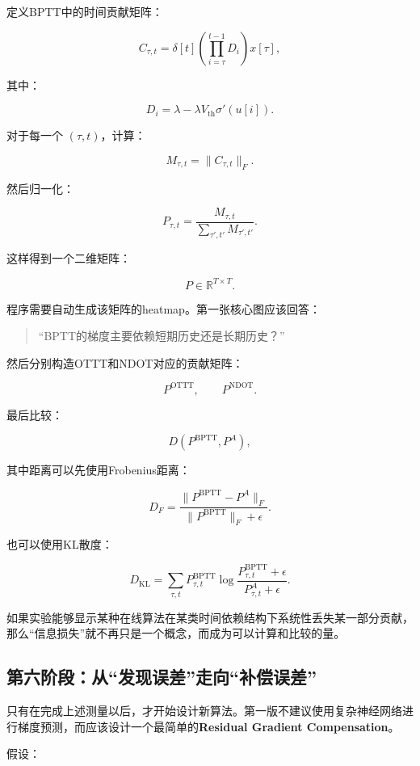 \documentclass[journal,12pt,onecolumn]{IEEEtran}
\begin{document}
定义BPTT中的时间贡献矩阵：

\[
C_{\tau,t}
=
\delta[t]
\left(
\prod_{i=\tau}^{t-1}D_i
\right)
x[\tau],
\]

其中：

\[
D_i
=
\lambda
-
\lambda V_{\mathrm{th}}
\sigma'(u[i]).
\]

对于每一个 \((\tau,t)\)，计算：

\[
M_{\tau,t}
=
\|C_{\tau,t}\|_F.
\]

然后归一化：

\[
P_{\tau,t}
=
\frac{M_{\tau,t}}
{\sum_{\tau',t'}M_{\tau',t'}}.
\]

这样得到一个二维矩阵：

\[
P\in\mathbb{R}^{T\times T}.
\]

程序需要自动生成该矩阵的heatmap。第一张核心图应该回答：

\begin{quote}
“BPTT的梯度主要依赖短期历史还是长期历史？”
\end{quote}

然后分别构造OTTT和NDOT对应的贡献矩阵：

\[
P^{\mathrm{OTTT}},
\qquad
P^{\mathrm{NDOT}}.
\]

最后比较：

\[
D(P^{\mathrm{BPTT}},P^{A}),
\]

其中距离可以先使用Frobenius距离：

\[
D_F
=
\frac{
\|P^{\mathrm{BPTT}}-P^A\|_F
}{
\|P^{\mathrm{BPTT}}\|_F+\epsilon
}.
\]

也可以使用KL散度：

\[
D_{\mathrm{KL}}
=
\sum_{\tau,t}
P^{\mathrm{BPTT}}_{\tau,t}
\log
\frac{
P^{\mathrm{BPTT}}_{\tau,t}+\epsilon
}{
P^A_{\tau,t}+\epsilon
}.
\]

如果实验能够显示某种在线算法在某类时间依赖结构下系统性丢失某一部分贡献，那么“信息损失”就不再只是一个概念，而成为可以计算和比较的量。


\subsection{第六阶段：从“发现误差”走向“补偿误差”}

只有在完成上述测量以后，才开始设计新算法。第一版不建议使用复杂神经网络进行梯度预测，而应该设计一个最简单的\textbf{Residual Gradient Compensation}。

假设：
\end{document}
